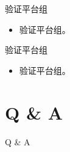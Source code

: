 \documentclass[cjk]{beamer}
\begin{document}
\begin{CJK}{UTF8}{gbsn}
\begin{frame}
    \begin{block}{验证平台组}
      \begin{itemize}
      \item 验证平台组。
      \end{itemize}
    \end{block}

    \begin{block}{验证平台组}
      \begin{itemize}
      \item 验证平台组。
      \end{itemize}
    \end{block}
  \end{frame}

  \section{Q \& A}

  \begin{frame}
    \Huge{\centerline{Q \& A}}
  \end{frame}


\end{CJK}
\end{document}
